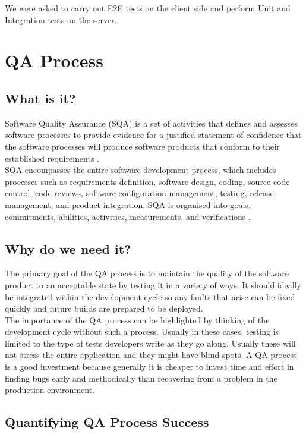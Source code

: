 We were asked to carry out E2E tests on the client side and perform Unit and Integration tests on the server.

\section{QA Process}
\label{sec:qa-process}

\subsection{What is it?}
\label{subsec:qa-process-what-is-it}
Software Quality Assurance (SQA) is a set of activities that defines and assesses  software processes to provide evidence for a justified statement of confidence that the software processes will produce software products that conform to their established requirements \cite{qa-standard}.
\\

SQA encompasses the entire software development process, which includes processes such as requirements definition, software design, coding, source code control, code reviews, software configuration management, testing, release management, and product integration. SQA is organised into goals, commitments, abilities, activities, measurements, and verifications \cite{project-quality-management}.

\subsection{Why do we need it?}
\label{subsec:qa-process-why-do-we-need-it}
The primary goal of the QA process is to maintain the quality of the software product to an acceptable state by testing it in a variety of ways. It should ideally be integrated within the development cycle so any faults that arise can be fixed quickly and future builds are prepared to be deployed.
\\

The importance of the QA process can be highlighted by thinking of the development cycle without such a process. Usually in these cases, testing is limited to the type of tests developers write as they go along. Usually these will not stress the entire application and they might have blind spots. A QA process is a good investment because generally it is cheaper to invest time and effort in finding bugs early and methodically than recovering from a problem in the production environment.

\subsection{Quantifying QA Process Success}
\label{subsec:quantifying-qa-process-success}

